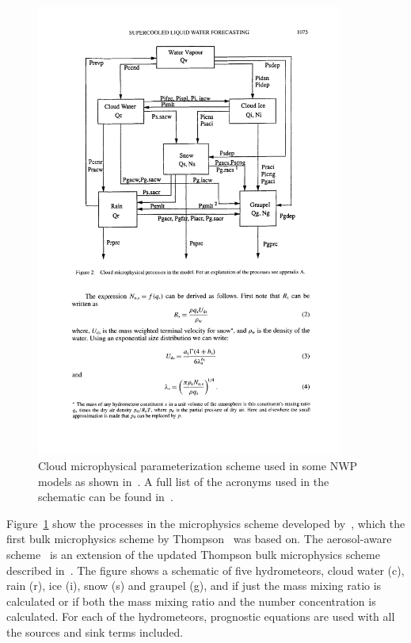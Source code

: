 \begin{figure}[h]
\centering
\includegraphics[width=0.9\textwidth]{model_methods/microphysics.pdf}
\caption{Cloud microphysical parameterization scheme used in some NWP models as shown in~\citet{Reisner1998}. A full list of the acronyms used in the schematic can be found in~\citet{Reisner1998}.}
\label{fig:microphysics}
\end{figure}

Figure~\ref{fig:microphysics} show the processes in the microphysics scheme developed by~\citet{Reisner1998}, which the first bulk microphysics scheme by Thompson~\citep{Thompson2004} was based on. The aerosol-aware scheme~\citep{Thompson2014} is an extension of the updated Thompson bulk microphysics scheme described in~\citet{Thompson2008}. The figure shows a schematic of five hydrometeors, cloud water (c), rain (r), ice (i), snow (s) and graupel (g), and if just the mass mixing ratio is calculated or if both the mass mixing ratio and the number concentration is calculated. For each of the hydrometeors, prognostic equations are used with all the sources and sink terms included.
 
